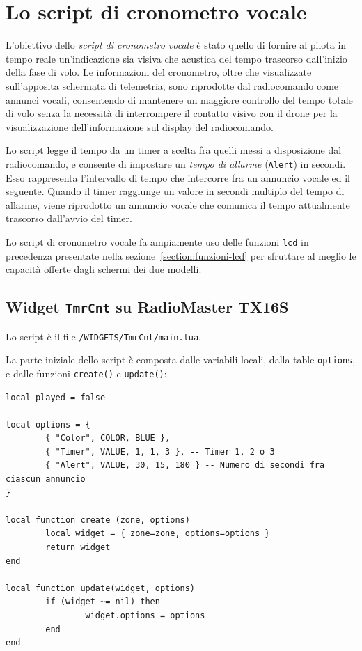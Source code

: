 \documentclass[a4paper, 12pt]{report} %
\begin{document}
\section{Lo script di cronometro vocale}\label{sec:tmrcnt}
L'obiettivo dello \emph{script di cronometro vocale} è stato quello di fornire al pilota in tempo reale un'indicazione sia visiva che acustica del tempo trascorso dall'inizio della fase di volo. Le informazioni del cronometro, oltre che visualizzate sull'apposita schermata di telemetria, sono riprodotte dal radiocomando come annunci vocali, consentendo di mantenere un maggiore controllo del tempo totale di volo senza la necessità di interrompere il contatto visivo con il drone per la visualizzazione dell'informazione sul display del radiocomando.

Lo script legge il tempo da un timer a scelta fra quelli messi a disposizione dal radiocomando, e consente di impostare un \emph{tempo di allarme} (\texttt{Alert}) in secondi. Esso rappresenta l'intervallo di tempo che intercorre fra un annuncio vocale ed il seguente. Quando il timer raggiunge un valore in secondi multiplo del tempo di allarme, viene riprodotto un annuncio vocale che comunica il tempo attualmente trascorso dall'avvio del timer.

Lo script di cronometro vocale fa ampiamente uso delle funzioni \texttt{lcd} in precedenza presentate nella sezione~\ref{section:funzioni-lcd} per sfruttare al meglio le capacità offerte dagli schermi dei due modelli.

\subsection{Widget \texttt{TmrCnt} su RadioMaster TX16S}

Lo script è il file \texttt{/WIDGETS/TmrCnt/main.lua}.

La parte iniziale dello script è composta dalle variabili locali, dalla table \texttt{options}, e dalle funzioni \texttt{create()} e \texttt{update()}:

\begin{lstlisting}
local played = false

local options = {
        { "Color", COLOR, BLUE }, 
        { "Timer", VALUE, 1, 1, 3 }, -- Timer 1, 2 o 3
        { "Alert", VALUE, 30, 15, 180 } -- Numero di secondi fra ciascun annuncio
}

local function create (zone, options)
        local widget = { zone=zone, options=options }
        return widget
end

local function update(widget, options)
        if (widget ~= nil) then
                widget.options = options
        end
end
\end{lstlisting}
\end{document}
